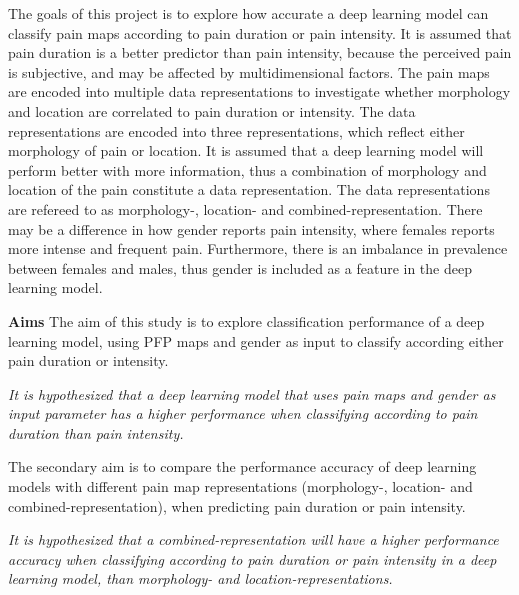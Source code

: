 \noindent
The goals of this project is to explore how accurate a deep learning model can classify pain maps according to pain duration or pain intensity. It is assumed that pain duration is a better predictor than pain intensity, because the perceived pain is subjective, and may be affected by multidimensional factors. 
The pain maps are encoded into multiple data representations to investigate whether morphology and location are correlated to pain duration or intensity.\newline
\noindent
The data representations are encoded into three representations, which reflect either morphology of pain or location. It is assumed that a deep learning model will perform better with more information, thus a combination of morphology and location of the pain constitute a data representation.  The data representations are refereed to as morphology-, location- and combined-representation.
There may be a difference in how gender reports pain intensity, where females reports more intense and frequent pain. Furthermore, there is an imbalance in prevalence between females and males, thus gender is included as a feature in the deep learning model. \newline

\noindent
\textbf{Aims}\newline
\noindent
The aim of this study is to explore classification performance of a deep learning model, using PFP maps and gender as input to classify according either pain duration or intensity.


\begin{center}
\textit{It is hypothesized that a deep learning model that uses pain maps and gender as input parameter has a higher performance when classifying according to pain duration than pain intensity.}
\end{center}

\noindent
The secondary aim is to compare the performance accuracy of deep learning models with different pain map representations (morphology-, location- and combined-representation), when predicting pain duration or pain intensity.
\begin{center}
\textit{It is hypothesized that a combined-representation will have a higher performance accuracy when classifying according to pain duration or pain intensity in a deep learning model, than morphology- and location-representations.}
\end{center}
